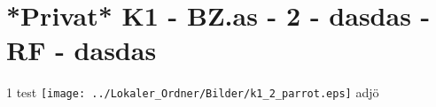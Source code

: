 \section{*Privat* K1 - BZ.as - 2 - dasdas - RF - dasdas}

\begin{langesbeispiel} \item[1] %
test \texttt{[image: ../Lokaler\_Ordner/Bilder/k1\_2\_parrot.eps]} adjö
\end{langesbeispiel}